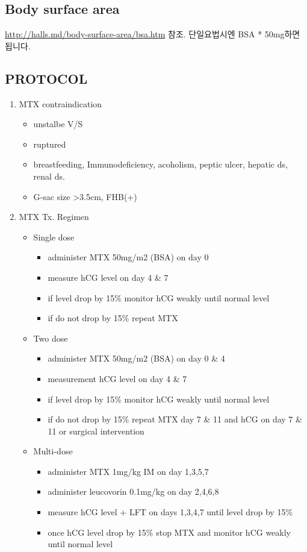 \subsection{Body surface area}
\url{http://halls.md/body-surface-area/bsa.htm} 참조.
단일요법시엔 BSA * 50mg하면 됩니다.

\subsection{PROTOCOL}
\begin{enumerate}\tightlist
\item MTX contraindication
	\begin{itemize}\tightlist
	\item unstalbe V/S
	\item ruptured
	\item breastfeeding, Immunodeficiency, acoholism, peptic ulcer, hepatic ds, renal ds.
	\item G-sac size \textgreater 3.5cm, FHB(+)
	\end{itemize}
\item MTX Tx. Regimen
	\begin{itemize}\tightlist
	\item Single dose
		\begin{itemize}\tightlist
		\item administer MTX 50mg/m2 (BSA) on day 0
		\item measure hCG level on day 4 \& 7 
		\item \MVRightarrow if level drop by 15\% \MVRightarrow monitor hCG weakly until normal level
		\item if do not drop by 15\% \MVRightarrow repeat MTX
		\end{itemize}
	\item Two dose
		\begin{itemize}\tightlist
		\item administer MTX 50mg/m2 (BSA) on day 0 \& 4
		\item measurement hCG level on day 4 \& 7
		\item if level drop by 15\% \MVRightarrow monitor hCG weakly until normal level
		\item if do not drop by 15\% \MVRightarrow repeat MTX day 7 \& 11 and hCG on day 7 \& 11 or surgical intervention
		\end{itemize}
	\item Multi-dose
		\begin{itemize}\tightlist
		\item administer MTX 1mg/kg IM on day 1,3,5,7
		\item administer leucovorin 0.1mg/kg on day 2,4,6,8
		\item measure hCG level + LFT on days 1,3,4,7 until level drop by 15\%
		\item once hCG level drop by 15\% stop MTX and monitor hCG weakly until normal level
		
		\end{itemize}
	\end{itemize}
\end{enumerate}
